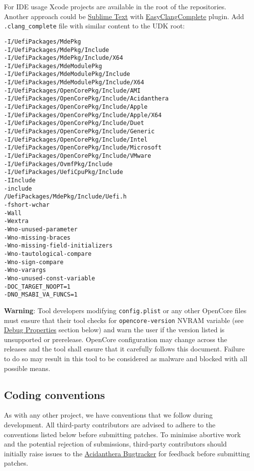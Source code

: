 \documentclass[]{article}
\begin{document}
For IDE usage Xcode projects are available in the root of the repositories. Another
approach could be \href{https://www.sublimetext.com}{Sublime Text} with
\href{https://niosus.github.io/EasyClangComplete}{EasyClangComplete} plugin.
Add \texttt{.clang\_complete} file with similar content to the UDK root:

\begin{lstlisting}[caption=ECC Configuration, label=eccfile, style=ocbash]
-I/UefiPackages/MdePkg
-I/UefiPackages/MdePkg/Include
-I/UefiPackages/MdePkg/Include/X64
-I/UefiPackages/MdeModulePkg
-I/UefiPackages/MdeModulePkg/Include
-I/UefiPackages/MdeModulePkg/Include/X64
-I/UefiPackages/OpenCorePkg/Include/AMI
-I/UefiPackages/OpenCorePkg/Include/Acidanthera
-I/UefiPackages/OpenCorePkg/Include/Apple
-I/UefiPackages/OpenCorePkg/Include/Apple/X64
-I/UefiPackages/OpenCorePkg/Include/Duet
-I/UefiPackages/OpenCorePkg/Include/Generic
-I/UefiPackages/OpenCorePkg/Include/Intel
-I/UefiPackages/OpenCorePkg/Include/Microsoft
-I/UefiPackages/OpenCorePkg/Include/VMware
-I/UefiPackages/OvmfPkg/Include
-I/UefiPackages/UefiCpuPkg/Include
-IInclude
-include
/UefiPackages/MdePkg/Include/Uefi.h
-fshort-wchar
-Wall
-Wextra
-Wno-unused-parameter
-Wno-missing-braces
-Wno-missing-field-initializers
-Wno-tautological-compare
-Wno-sign-compare
-Wno-varargs
-Wno-unused-const-variable
-DOC_TARGET_NOOPT=1
-DNO_MSABI_VA_FUNCS=1
\end{lstlisting}

\textbf{Warning}: Tool developers modifying \texttt{config.plist} or any other OpenCore
files must ensure that their tool checks for \texttt{opencore-version} NVRAM variable
(see \hyperref[miscdebugprops]{Debug Properties} section below) and warn the user
if the version listed is unsupported or prerelease. OpenCore configuration may change
across the releases and the tool shall ensure that it carefully follows this document.
Failure to do so may result in this tool to be considered as malware and blocked with
all possible means.

\subsection{Coding conventions}\label{configuration-conv}

As with any other project, we have conventions that we follow during development.
All third-party contributors are advised to adhere to the conventions listed below
before submitting patches. To minimise abortive work and the potential rejection of
submissions, third-party contributors should initially raise issues to the
\href{https://github.com/acidanthera/bugtracker}{Acidanthera Bugtracker}
for feedback before submitting patches.
\end{document}
